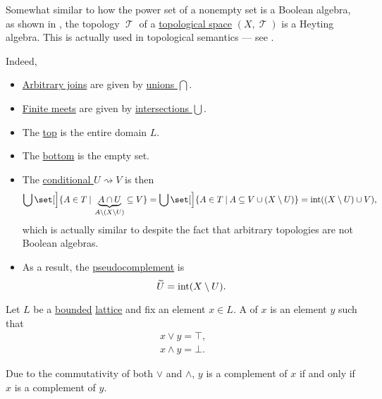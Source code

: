 \begin{example}\label{ex:topological_space_is_heyting_algebra}
  Somewhat similar to how the power set of a nonempty set is a Boolean algebra, as shown in , the topology \( \mscrT \) of a \hyperref[def:topological_space]{topological space} \( (X, \mscrT) \) is a Heyting algebra. This is actually used in topological semantics --- see .

  Indeed,
  \begin{itemize}
    \item \hyperref[def:semilattice/join]{Arbitrary joins} are given by \hyperref[def:basic_set_operations/union]{unions \( \bigcap \)}.
    \item \hyperref[def:semilattice/meet]{Finite meets} are given by \hyperref[def:basic_set_operations/intersection]{intersections \( \bigcup \)}.
    \item The \hyperref[def:extremal_points/top_and_bottom]{top} is the entire domain \( L \).
    \item The \hyperref[def:extremal_points/top_and_bottom]{bottom} is the empty set.
    \item The \hyperref[eq:def:heyting_algebra/conditional]{conditional \( U \rightsquigarrow V \)} is then
    \begin{equation*}
      \bigcup\set[\Big]{ A \in T \given \underbrace{A \cap U}_{A \setminus (X \setminus U)} \subseteq V }
      =
      \bigcup\set[\Big]{ A \in T \given A \subseteq V \cup (X \setminus U) }
      =
      \Int((X \setminus U) \cup V),
    \end{equation*}
    which is actually similar to  despite the fact that arbitrary topologies are not Boolean algebras.

    \item As a result, the \hyperref[def:heyting_algebra/pseudocomplement]{pseudocomplement} is
    \begin{equation*}
      \widetilde U = \operatorname{int}(X \setminus U).
    \end{equation*}
  \end{itemize}
\end{example}

\begin{definition}\label{def:bounded_lattice_complement}
  Let \( L \) be a \hyperref[def:semilattice/bounded]{bounded} \hyperref[def:semilattice/lattice]{lattice} and fix an element \( x \in L \). A  of \( x \) is an element \( y \) such that
  \begin{align}
    x \vee y = \top \label{def:bounded_lattice_complement/join}, \\
    x \wedge y = \bot \label{def:bounded_lattice_complement/meet}.
  \end{align}

  Due to the commutativity of both \( \vee \) and \( \wedge \), \( y \) is a complement of \( x \) if and only if \( x \) is a complement of \( y \).
\end{definition}

